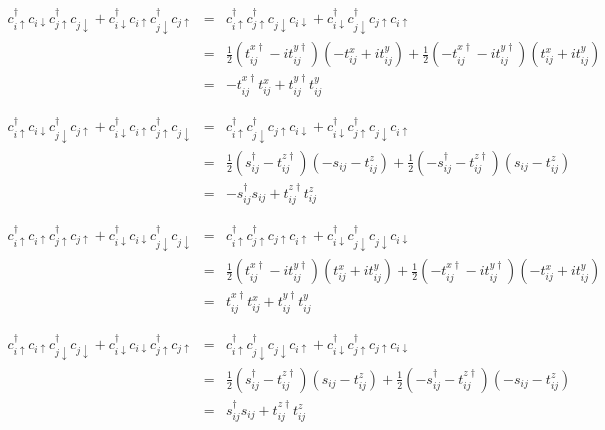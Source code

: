 \documentclass[12pt,a4paper]{article}
\newcommand{\hopping}[2] {
    c_{#1}^\dagger c_{#2}
}
\newcommand{\ppairing}[2] {
    c_{#1}^\dagger c_{#2}^\dagger
}
\newcommand{\hpairing}[2] {
    c_{#1} c_{#2}
}
\newcommand{\spinup} {
    \uparrow
}
\newcommand{\spindown} {
	\downarrow
}
\begin{document}
\begin{eqnarray*}
    \hopping{i\spinup}{i\spindown} \hopping{j\spinup}{j\spindown} + 
    \hopping{i\spindown}{i\spinup} \hopping{j\spindown}{j\spinup}
    & = &
    \ppairing{i\spinup}{j\spinup} \hpairing{j\spindown}{i\spindown} + 
    \ppairing{i\spindown}{j\spindown} \hpairing{j\spinup}{i\spinup} \\
    & = &
    \frac{1}{2} \left(t_{ij}^{x\dagger} - i t_{ij}^{y\dagger} \right) \left(-t_{ij}^{x} +i t_{ij}^{y} \right) + 
    \frac{1}{2} \left(-t_{ij}^{x\dagger} - i t_{ij}^{y\dagger} \right) \left(t_{ij}^{x} + i t_{ij}^{y} \right) \\
    & = &
    - t_{ij}^{x\dagger} t_{ij}^{x} + t_{ij}^{y\dagger} t_{ij}^{y}
\end{eqnarray*}

\begin{eqnarray*}
	\hopping{i\spinup}{i\spindown} \hopping{j\spindown}{j\spinup} +
	\hopping{i\spindown}{i\spinup} \hopping{j\spinup}{j\spindown}
	& = &
	\ppairing{i\spinup}{j\spindown} \hpairing{j\spinup}{i\spindown} +
	\ppairing{i\spindown}{j\spinup} \hpairing{j\spindown}{i\spinup} \\
	& = &
    \frac{1}{2} \left(s_{ij}^{\dagger} - t_{ij}^{z\dagger} \right) \left(-s_{ij} - t_{ij}^{z} \right) + 
    \frac{1}{2} \left(-s_{ij}^{\dagger} - t_{ij}^{z\dagger} \right) \left(s_{ij}- t_{ij}^{z} \right) \\
    & = &
    - s_{ij}^{\dagger} s_{ij} + t_{ij}^{z\dagger} t_{ij}^{z}
\end{eqnarray*}

\begin{eqnarray*}
    \hopping{i\spinup}{i\spinup} \hopping{j\spinup}{j\spinup} + 
    \hopping{i\spindown}{i\spindown} \hopping{j\spindown}{j\spindown}
    & = & 
    \ppairing{i\spinup}{j\spinup} \hpairing{j\spinup}{i\spinup} +
    \ppairing{i\spindown}{j\spindown} \hpairing{j\spindown}{i\spindown} \\
    & = &
    \frac{1}{2} \left(t_{ij}^{x\dagger} - i t_{ij}^{y\dagger} \right) \left(t_{ij}^{x} + i t_{ij}^{y} \right) +
    \frac{1}{2} \left(-t_{ij}^{x\dagger} - i t_{ij}^{y\dagger} \right) \left(-t_{ij}^{x} + i t_{ij}^{y} \right) \\
    & = &
    t_{ij}^{x\dagger} t_{ij}^{x} + t_{ij}^{y\dagger} t_{ij}^{y}
\end{eqnarray*}

\begin{eqnarray*}
	\hopping{i\spinup}{i\spinup} \hopping{j\spindown}{j\spindown} +
	\hopping{i\spindown}{i\spindown} \hopping{j\spinup}{j\spinup}
	& = &
	\ppairing{i\spinup}{j\spindown} \hpairing{j\spindown}{i\spinup} +
    \ppairing{i\spindown}{j\spinup} \hpairing{j\spinup}{i\spindown} \\
    & = &
    \frac{1}{2} \left(s_{ij}^{\dagger} - t_{ij}^{z\dagger} \right) \left(s_{ij} - t_{ij}^{z} \right) +
    \frac{1}{2} \left(-s_{ij}^{\dagger} - t_{ij}^{z\dagger} \right) \left(-s_{ij}- t_{ij}^{z} \right) \\
    & = &
    s_{ij}^{\dagger} s_{ij} + t_{ij}^{z\dagger} t_{ij}^{z}
\end{eqnarray*}
\end{document}
